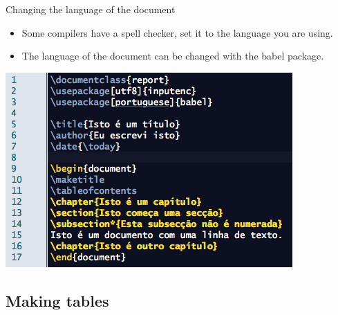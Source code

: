 \documentclass[usenames,dvipsnames,aspectratio=169]{beamer}
\newcommand{\aitem}{\item[$\cdot$]}
\begin{document}

\begin{frame}[t]{Changing the language of the document}
\begin{itemize}
\aitem Some compilers have a spell checker, set it to the language you are using.
\end{itemize}
\begin{minipage}{5cm}
\begin{itemize}
\aitem The language of the document can be changed with the \textcolor{PineGreen}{babel} package.
\end{itemize}
\end{minipage}%
\hspace*{1cm}%
\begin{minipage}{8cm}
\includegraphics[width=\linewidth]{tituloeindice.png}
\end{minipage}
\end{frame}


\subsection{Making tables}
\end{document}
